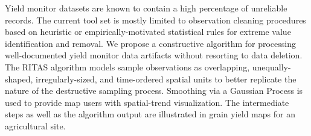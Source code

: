 
Yield monitor datasets are known to contain a high percentage of
unreliable records. The current tool set is mostly limited to
observation cleaning procedures based on heuristic or
empirically-motivated statistical rules for extreme value
identification and removal. We propose a constructive algorithm for
processing well-documented yield monitor data artifacts without
resorting to data deletion. The RITAS algorithm models sample
observations as overlapping, unequally-shaped, irregularly-sized, and
time-ordered spatial units to better replicate the nature of the
destructive sampling process. Smoothing via a Gaussian Process is used
to provide map users with spatial-trend visualization. The
intermediate steps as well as the algorithm output are illustrated in
grain yield maps for an agricultural site.

